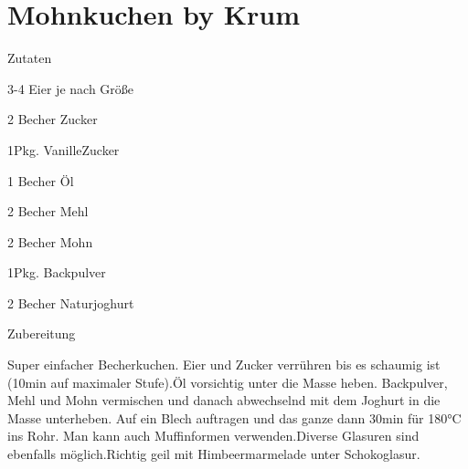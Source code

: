 \chapter*{Mohnkuchen by Krum}
\begin{multicols}{2}
 {\Large Zutaten}
 \begin{Zutaten}
		\item 3-4 Eier je nach Größe
		\item 2 Becher Zucker
		\item 1Pkg. VanilleZucker
		\item 1 Becher Öl
		\item 2 Becher Mehl
		\item 2 Becher Mohn
		\item 1Pkg. Backpulver
		\item 2 Becher Naturjoghurt
		
		
		
\end{Zutaten}
	
\columnbreak
{}
\end{multicols}

{\Large Zubereitung} \newline
\begin{addmargin}[1cm]{0cm}
	Super einfacher Becherkuchen.\newline
	Eier und Zucker verrühren bis es schaumig ist (10min auf maximaler Stufe).\newline Öl vorsichtig unter die
	Masse heben.\newline
	Backpulver, Mehl und Mohn vermischen und danach abwechselnd mit dem Joghurt in die Masse unterheben.\newline
	Auf ein Blech auftragen und das ganze dann 30min für 180°C ins Rohr.
	Man kann auch Muffinformen verwenden.\newline Diverse Glasuren sind ebenfalls möglich.\newline Richtig geil mit Himbeermarmelade unter Schokoglasur.
	
	
	
\end{addmargin}

